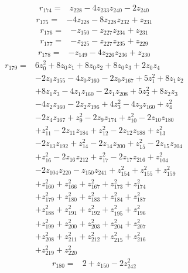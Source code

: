 \begin{align*}
r_{174}={}&z_{228} -4z_{233}z_{240} -2z_{240}
\end{align*}
\begin{align*}
r_{175}={}&-4z_{228} -8z_{228}z_{232} +z_{231}
\end{align*}
\begin{align*}
r_{176}={}&-z_{150} -z_{227}z_{234} +z_{231}
\end{align*}
\begin{align*}
r_{177}={}&-z_{225} -z_{227}z_{235} +z_{229}
\end{align*}
\begin{align*}
r_{178}={}&-z_{149} -4z_{226}z_{236} +z_{230}
\end{align*}
\begin{align*}
r_{179}={}&6z_{0}^{2} +8z_{0}z_{1} +8z_{0}z_{2} +8z_{0}z_{3} +2z_{0}z_{4}\\
&-2z_{0}z_{155} -4z_{0}z_{160} -2z_{0}z_{167} +5z_{1}^{2} +8z_{1}z_{2}\\
&+8z_{1}z_{3} -4z_{1}z_{160} -2z_{1}z_{208} +5z_{2}^{2} +8z_{2}z_{3}\\
&-4z_{2}z_{160} -2z_{2}z_{196} +4z_{3}^{2} -4z_{3}z_{160} +z_{4}^{2}\\
&-2z_{4}z_{167} +z_{9}^{2} -2z_{9}z_{174} +z_{10}^{2} -2z_{10}z_{180}\\
&+z_{11}^{2} -2z_{11}z_{184} +z_{12}^{2} -2z_{12}z_{188} +z_{13}^{2}\\
&-2z_{13}z_{192} +z_{14}^{2} -2z_{14}z_{200} +z_{15}^{2} -2z_{15}z_{204}\\
&+z_{16}^{2} -2z_{16}z_{212} +z_{17}^{2} -2z_{17}z_{216} +z_{104}^{2}\\
&-2z_{104}z_{220} -z_{150}z_{241} +z_{154}^{2} +z_{155}^{2} +z_{159}^{2}\\
&+z_{160}^{2} +z_{166}^{2} +z_{167}^{2} +z_{173}^{2} +z_{174}^{2}\\
&+z_{179}^{2} +z_{180}^{2} +z_{183}^{2} +z_{184}^{2} +z_{187}^{2}\\
&+z_{188}^{2} +z_{191}^{2} +z_{192}^{2} +z_{195}^{2} +z_{196}^{2}\\
&+z_{199}^{2} +z_{200}^{2} +z_{203}^{2} +z_{204}^{2} +z_{207}^{2}\\
&+z_{208}^{2} +z_{211}^{2} +z_{212}^{2} +z_{215}^{2} +z_{216}^{2}\\
&+z_{219}^{2} +z_{220}^{2}
\end{align*}
\begin{align*}
r_{180}={}&2 +z_{150} -2z_{242}^{2}
\end{align*}
